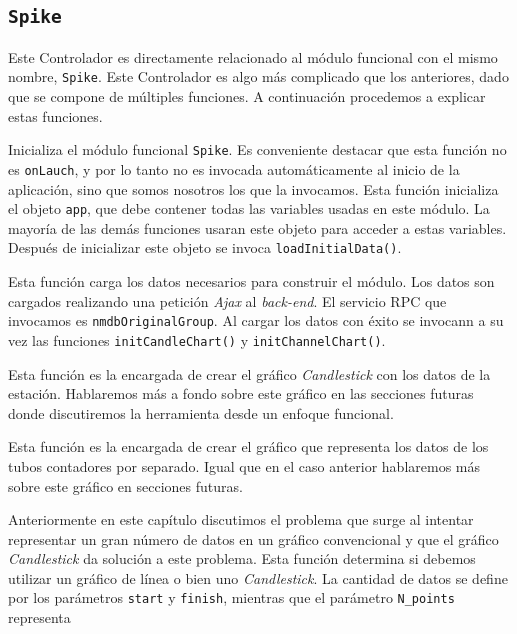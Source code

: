 	\subsection{\texttt{Spike}}
		Este Controlador es directamente relacionado al módulo funcional con el mismo nombre, \texttt{Spike}. Este Controlador es algo más
		complicado que los anteriores, dado que se compone de múltiples funciones. A continuación procedemos a explicar estas
		funciones.
		\begin{description}[style=unboxed,leftmargin=0cm]
			\item[\texttt{Launch()}] Inicializa el módulo funcional \texttt{Spike}. Es conveniente destacar que esta función no es
			  \texttt{onLauch}, y por lo tanto no es invocada automáticamente al inicio de la aplicación, sino que somos nosotros los que
			  la invocamos. Esta función inicializa el objeto \texttt{app}, que debe contener todas las variables usadas en este
			  módulo. La mayoría de las demás funciones usaran este objeto para acceder a estas variables. Después de inicializar este
			  objeto se invoca \texttt{loadInitialData()}.
			\item[\texttt{loadInitialData()}] Esta función carga los datos necesarios para construir el módulo. Los datos son cargados
			  realizando una petición \emph{Ajax} al \emph{back-end}. El servicio RPC que invocamos es \texttt{nmdbOriginalGroup}. Al cargar los
			  datos con éxito se invocann a su vez las funciones \texttt{initCandleChart()} y \texttt{initChannelChart()}. 
			\item[\texttt{initCandleChart()}] Esta función es la encargada de crear el gráfico \emph{Candlestick} con los datos de la
			  estación. Hablaremos más a fondo sobre este gráfico en las secciones futuras donde discutiremos la herramienta desde un
			  enfoque funcional.
			\item[\texttt{initChannelChart()}] Esta función es la encargada de crear el gráfico que representa los datos de los tubos
			  contadores por separado. Igual que en el caso anterior hablaremos más sobre este gráfico en secciones futuras.
			\item[\texttt{LineOrOhcl(start, finish, N\_points)}] Anteriormente en este capítulo discutimos el problema que surge al
			  intentar representar un gran número de datos en un gráfico convencional y que el gráfico \emph{Candlestick} da solución a
			  este problema. Esta función determina si debemos utilizar un gráfico de línea o bien uno \emph{Candlestick}. La cantidad de
			  datos se define por los parámetros \texttt{start} y \texttt{finish}, mientras que el parámetro \texttt{N\_points} representa

\end{description}
